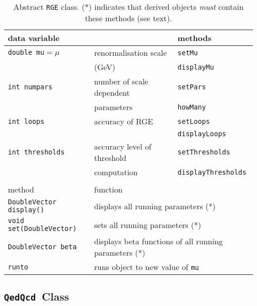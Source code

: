 \documentclass[]{article}
\def\code#1{\small{\tt #1}\normalsize}
\begin{document}
\begin{table}\begin{center}
\begin{tabular}{lll} 
data variable & & methods \\ \hline
\code{double mu}$=\mu$ & renormalisation scale & \code{setMu} \\
& (GeV) &  \code{displayMu} \\ \hline
\code{int numpars} & number of scale dependent & \code{setPars} \\
 & parameters & \code{howMany} \\ \hline
\code{int loops} & accuracy of RGE & \code{setLoops} \\
 & & \code{displayLoops} \\ \hline
\code{int thresholds} & accuracy level of threshold &
\code{setThresholds} \\  & computation & \code{displayThresholds}\\
 & & \\
method & \multicolumn{2}{l}{function} \\ \hline
\code{DoubleVector display()} & \multicolumn{2}{l}{displays all running
parameters (*)} \\ 
\code{void set(DoubleVector)} & \multicolumn{2}{l}{sets all running
parameters (*)} \\ 
\code{DoubleVector beta} & \multicolumn{2}{l}{displays beta functions of all
running parameters (*)} \\ 
\code{runto} & \multicolumn{2}{l}{runs object to new value of
\code{mu}} \\ 
\end{tabular}\caption{\label{tab:rge} Abstract \code{RGE} class. (*) indicates that derived objects {\em must}\/
contain these methods (see text). }\end{center}\end{table}

\subsection{\code{QedQcd}~Class}
\end{document}
